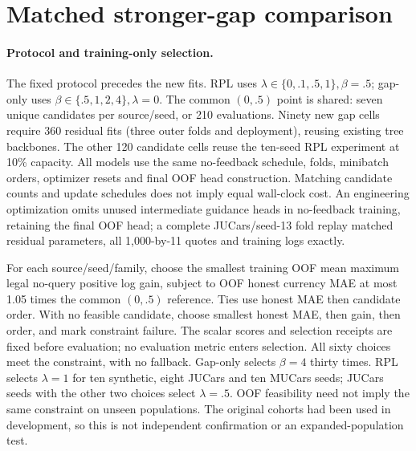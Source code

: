 \documentclass[11pt]{article}
\begin{document}
\section{Matched stronger-gap comparison}
\paragraph{Protocol and training-only selection.}
The fixed protocol precedes the new fits. RPL uses
$\lambda\in\{0,.1,.5,1\},\beta=.5$; gap-only uses
$\beta\in\{.5,1,2,4\},\lambda=0$. The common $(0,.5)$ point is shared:
seven unique candidates per source/seed, or 210 evaluations. Ninety new
gap cells require 360 residual fits (three outer folds and deployment),
reusing existing tree backbones. The other 120 candidate cells reuse the
ten-seed RPL experiment at 10\% capacity. All models use the same no-feedback
schedule, folds, minibatch orders, optimizer resets and final OOF head
construction. Matching candidate counts and update schedules does not imply
equal wall-clock cost. An engineering optimization omits unused intermediate
guidance heads in no-feedback training, retaining the final OOF head;
a complete JUCars/seed-13 fold replay matched residual parameters,
all 1,000-by-11 quotes and training logs exactly.

For each source/seed/family, choose the smallest training OOF mean maximum
legal no-query positive log gain, subject to OOF honest currency MAE at most
1.05 times the common $(0,.5)$ reference. Ties use honest MAE then candidate
order. With no feasible candidate, choose smallest honest MAE, then gain,
then order, and mark constraint failure. The scalar scores and selection
receipts are fixed before evaluation; no evaluation metric enters selection.
All sixty choices meet the constraint, with no fallback. Gap-only selects
$\beta=4$ thirty times. RPL selects $\lambda=1$ for ten synthetic, eight
JUCars and ten MUCars seeds; JUCars seeds with the other two choices select
$\lambda=.5$. OOF feasibility need not imply the same constraint on unseen
populations. The original cohorts had been used in development, so this is
not independent confirmation or an expanded-population test.
\end{document}
